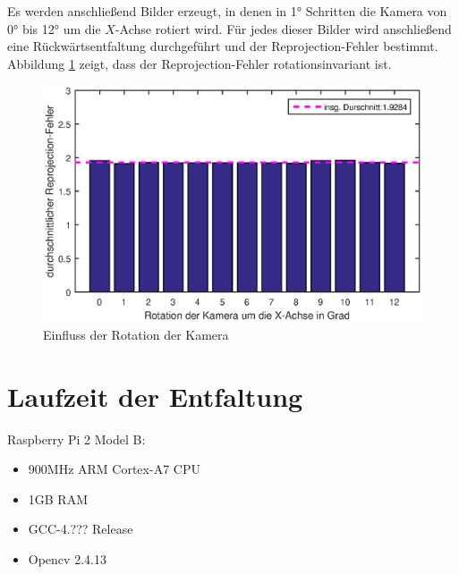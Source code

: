 Es werden anschließend Bilder erzeugt, in denen in 1° Schritten die Kamera von 0° bis 12° um die $X$-Achse rotiert wird. Für jedes dieser Bilder wird anschließend eine Rückwärtsentfaltung durchgeführt und der Reprojection-Fehler bestimmt. Abbildung \ref{fig:influenceRot} zeigt, dass der Reprojection-Fehler rotationsinvariant ist. 


\begin{figure}[!htb]
	\centering
	\includegraphics[width=\textwidth]{images/reprojectionErrorDeg2.eps}
	\caption{Einfluss der Rotation der Kamera}
	\label{fig:influenceRot}
\end{figure}





\section{Laufzeit der Entfaltung}

Raspberry Pi 2 Model B:
\begin{itemize}
	\item 900MHz ARM Cortex-A7 CPU
	\item 1GB RAM
	\item GCC-4.??? Release
	\item Opencv 2.4.13
\end{itemize}

